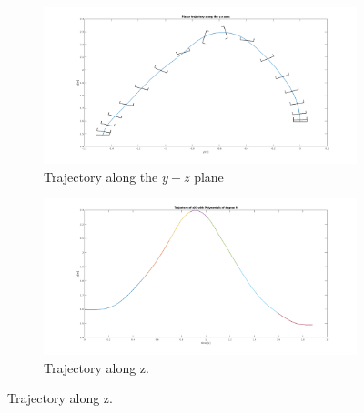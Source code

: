 \documentclass{thesisreport}
\begin{document}
\begin{figure}[h]
	\begin{subfigure}{0.48\textwidth}
		\includegraphics[width=\linewidth]{Images/optimization/trajectory.png}
		\caption{Trajectory along the $y-z$ plane} \label{fig:y_z_fmincon}
	\end{subfigure}\hspace*{\fill}
	\begin{subfigure}{0.48\textwidth}
		\includegraphics[width=\linewidth]{Images/optimization/z.png}
		\caption{Trajectory along z.} \label{fig:z_fmincon}
	\end{subfigure}


\end{figure}
\end{document}

